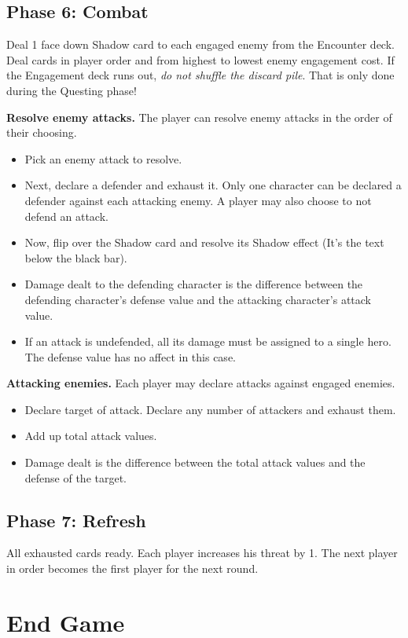 \documentclass[12pt]{article}
\newenvironment{itemizeCustom}
{\begin{itemize}
  \setlength{\itemsep}{1pt}
  \setlength{\parskip}{0pt}
  \setlength{\parsep}{0pt}}
{\end{itemize}}
\begin{document}
\begin{multicols*}{2}
\subsection*{Phase 6: Combat}
Deal 1 face down Shadow card to each engaged enemy from the Encounter deck. Deal cards in player order and from highest to lowest enemy engagement cost. If the Engagement deck runs out, \emph{do not shuffle the discard pile}. That is only done during the Questing phase!

\noindent
\textbf{Resolve enemy attacks.} The player can resolve enemy attacks in the order of their choosing. 
\begin{itemizeCustom}
	\item Pick an enemy attack to resolve.
	\item Next, declare a defender and exhaust it. Only one character can be declared a defender against each attacking enemy. A player may also choose to not defend an attack. 
	\item Now, flip over the Shadow card and resolve its Shadow effect (It's the text below the black bar). 
	\item Damage dealt to the defending character is the difference between the defending character's defense value and the attacking character's attack value.
	\item If an attack is undefended, all its damage must be assigned to a single hero. The defense value has no affect in this case.
\end{itemizeCustom}

\noindent
\textbf{Attacking enemies.} Each player may declare attacks against engaged enemies. 
\begin{itemizeCustom}
	\item Declare target of attack. Declare any number of attackers and exhaust them.
	\item Add up total attack values.
	\item Damage dealt is the difference between the total attack values and the defense of the target.
\end{itemizeCustom}

\subsection*{Phase 7: Refresh}
All exhausted cards ready. Each player increases his threat by 1. The next player in order becomes the first player for the next round. 

\section*{End Game}

\end{multicols*}
\end{document}
